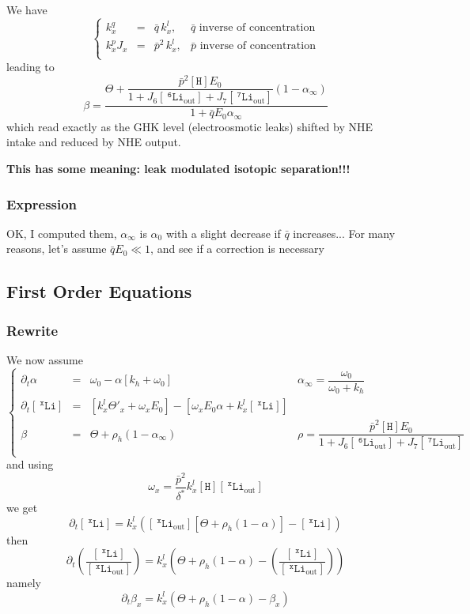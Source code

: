 \documentclass[aps,onecolumn,12pt]{revtex4}
\newcommand{\mychem}[1]{\mathtt{#1}}
\newcommand{\myconc}[1]{\left\lbrack{#1}\right\rbrack}
\newcommand{\spLi}[1]{{~^{\mychem{#1}}\mychem{Li}}}
\newcommand{\Li}[1]{\myconc{\spLi{#1}}}
\newcommand{\spLiOut}[1]{{\spLi{#1}}_{\mathrm{out}}}
\newcommand{\LiOut}[1]{\myconc{\spLiOut{#1}}}
\newcommand{\spproton}{\mychem{H}}
\newcommand{\proton}{\myconc{\spproton}}
\begin{document}
We have
\begin{equation}
\left\lbrace
	\begin{array}{rcll}
	k_x^q    & = & \bar{q}\,k_x^l,  &  \bar{q}\text{ inverse of concentration}\\
	k_x^pJ_x & = & \bar{p}^2\,k_x^l, & \bar{p}\text{ inverse of concentration}\\
	\end{array}
\right.
\end{equation}
leading to
\begin{equation}
	\beta = \dfrac{\Theta+\dfrac{\bar{p}^2 \proton E_0}{1+J_6\LiOut{6}+J_7\LiOut{7}} \left(1-\alpha_\infty\right)}{1+\bar{q}E_0\alpha_\infty}
\end{equation}
which read exactly as the GHK level (electroosmotic leaks) shifted by NHE intake and reduced by NHE output.

\centerline{\bf This has some meaning: leak modulated isotopic separation!!!}

\subsubsection{Expression}
OK, I computed them, $\alpha_\infty$ is $\alpha_0$ with a slight decrease if $\bar{q}$ increases...
For many reasons, let's assume $\bar{q}E_0\ll 1$, and see if a correction is necessary

\subsection{First Order Equations}
\subsubsection{Rewrite}
We now assume
\begin{equation}
\left\lbrace
\begin{array}{rcll}
	\partial_t\alpha    & = & \omega_0 - \alpha\left\lbrack k_h+\omega_0\right\rbrack & \alpha_\infty = \dfrac{\omega_0}{\omega_0+k_h}\\
	\partial_t\Li{x} & = & \left\lbrack k_x^l\Theta'_x+\omega_x E_0\right\rbrack
		-\left\lbrack
			\omega_x E_0\alpha +  k_x^l\Li{x}
		\right\rbrack & \\
	\beta & = & \Theta + \rho_h \left(1-\alpha_\infty\right) & \rho = \dfrac{\bar{p}^2 \proton E_0}{1+J_6\LiOut{6}+J_7\LiOut{7}} \\
	\end{array}
\right.
\end{equation}
and using
$$
	\omega_x =  \dfrac{\bar{p}^2}{\delta^\ast} k_x^l\proton \LiOut{x}
$$
we get
$$
	\partial_t\Li{x} =
	  k_x^l \left(\LiOut{x} \left[ \Theta + \rho_h \left(1-\alpha\right)\right] - \Li{x} \right)
$$
then
\begin{equation}
	\partial_t\left( \dfrac{\Li{x}}{\LiOut{x}} \right)= k_x^l \left( \Theta + \rho_h(1-\alpha) - \left( \dfrac{\Li{x}}{\LiOut{x}} \right)\right)
\end{equation}
namely
\begin{equation}
	\partial_t \beta_x =  k_x^l \left( \Theta + \rho_h(1-\alpha) - \beta_x\right)
\end{equation}
\end{document}
